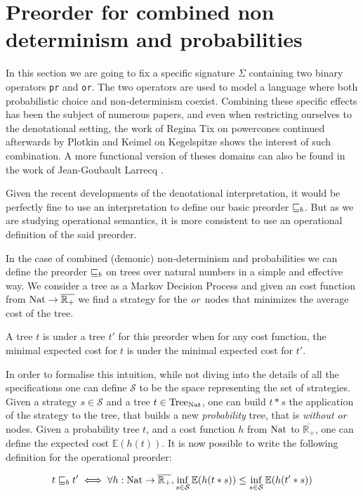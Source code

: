 \section{Preorder for combined non determinism and probabilities}

In this section we are going to fix a specific signature $\Sigma$
containing two binary operators \texttt{pr} and \texttt{or}. The two
operators are used to model a language where both probabilistic choice 
and non-determinism coexist. Combining these specific effects has been 
the subject of numerous papers, and even when restricting ourselves to the 
denotational setting, the work of Regina Tix on powercones \cite{tix2009semantic} 
continued afterwards by Plotkin and Keimel \cite{KeimelP2016} on Kegelspitze
shows the interest of such combination.
A more functional version of theses domains can also be found in the work of Jean-Goubault Larrecq 
\cite{JGL-mscs16}.

Given the recent developments of the denotational interpretation, 
it would be perfectly fine to use an interpretation 
to define our basic preorder $\sqsubseteq_b$. But as we are studying 
operational semantics, it is more consistent to use an operational 
definition of the said preorder.

In the case of combined (demonic) non-determinism and probabilities we can define 
the preorder $\sqsubseteq_b$ on trees over natural numbers in a simple and
effective way. We consider a tree as a Markov Decision Process 
and given an cost function from $\textnormal{Nat} \to \overline{\mathbb{R}_+}$
we find a strategy for the $\operatorname{\mathit{or}}$ nodes that minimizes the average
cost of the tree. 

A tree $t$ is under a tree $t'$ for this preorder when for any 
cost function, the minimal expected cost for $t$ is under the 
minimal expected cost for $t'$.

In order to formalise this intuition, while not diving into the details of 
all the specifications one can 
define $\mathcal{S}$ to be the space representing 
the set of strategies. Given a strategy $s \in \mathcal{S}$ and 
a tree $t \in \textnormal{Tree}_{\textnormal{Nat}}$, one can build $t*s$ the application of 
the strategy to the tree, that builds a new \emph{probability} tree, that 
is \emph{without} $\operatorname{\mathit{or}}$ nodes. Given a probability tree $t$, and a 
cost function $h$ from $\textnormal{Nat}$ to $\overline{\mathbb{R}_+}$, one can define the expected cost $\mathbb{E} (h(t))$.
It is now possible to write the following definition for the operational 
preorder:

\begin{equation*}
    t \sqsubseteq_b t' \iff 
    \forall h : \textnormal{Nat} \to \overline{\mathbb{R}_+}, 
    \inf_{s \in \mathcal{S}} \mathbb{E}(h(t*s)) \leq 
    \inf_{s \in \mathcal{S}} \mathbb{E}(h(t'*s))
\end{equation*}

